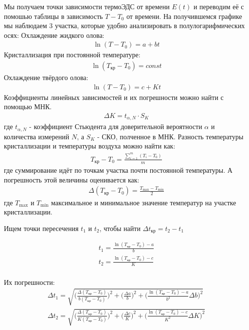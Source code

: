 \documentclass{article}
\begin{document}
Мы получаем точки зависимости термоЭДС от времени $E(t)$ и переводим её с помошью таблицы в зависимость $T-T_0$ от времени.
На получившемся графике мы наблюдаем 3 участка, которые удобно анализировать в полулогарифмических осях:
Охлаждение жидкого олова:
\begin{gather*}
    \ln (T-T_0)=a+bt
\end{gather*}
Кристаллизация при постоянной температуре:
\begin{gather*}
    \ln (T_{ \text{кр}}-T_0)=const
\end{gather*}
Охлаждение твёрдого олова:
\begin{gather*}
    \ln (T-T_0) =c + Kt
\end{gather*}
Коэффициенты линейных зависимостей и их погрешности можно найти с помощью МНК.
\begin{gather*}
    \Delta K = t_{ \alpha, N}\cdot S_{ K}
\end{gather*}
где $t_{ \alpha, N}$ - коэффициент Стьюдента для доверительной вероятности $\alpha$ и количества измерений $N$,
а $S_{ K}$ - СКО, полченное в МНК.
Разность температуры кристаллизации и температуры воздуха можно найти как:
\begin{gather*}
    T_{ \text{кр}}-T_{ 0}= \frac{ \sum\limits_{i=1}^{ m}(T_i-T_{ 0})}{ m}
\end{gather*}
где суммирование идёт по точкам участка почти постоянной температуры.
А погрешность этой величины оценивается как:
\begin{gather*}
    \Delta (T_{ \text{кр}}-T_{ 0}) = \frac{ T_{ \text{max}}-T_{ \text{min}}}{ 2}
\end{gather*}
где $T_{ \text{max}}\text{ и }T_{ \text{min}}$ максимальное и минимальное значение температур на участке кристаллизации.

Ищем точки пересечения $t_1$ и $t_2$, чтобы найти $\Delta t_{ \text{кр}}=t_2 - t_1$

\begin{gather*}
    t_{ 1} = \frac{ \ln(T_{ \text{кр}}-T_0)-a}{ b}\\
    t_{ 2} = \frac{ \ln(T_{ \text{кр}}-T_0)-c}{ K}\\
\end{gather*}

Их погрешности:
\begin{gather*}
    \Delta t_1 = \sqrt{\bigg( \frac{ \Delta{(T_{\text{кр}}-T_0)}}{ b(T_{\text{кр}}-T_0)} \bigg)^2 +
        \bigg( \frac{ \Delta{a}}{ b} \bigg)^2 + 
        \bigg( \frac{ \ln(T_{ \text{кр}}-T_0)-a}{ b^2}\Delta{b} \bigg)^2}\\
    \Delta t_2 = \sqrt{\bigg( \frac{ \Delta{(T_{\text{кр}}-T_0)}}{ K(T_{\text{кр}}-T_0)} \bigg)^2 +
        \bigg( \frac{ \Delta{c}}{ K} \bigg)^2 + 
        \bigg( \frac{ \ln(T_{ \text{кр}}-T_0)-c}{ K^2}\Delta{K} \bigg)^2}
\end{gather*}
\end{document}
